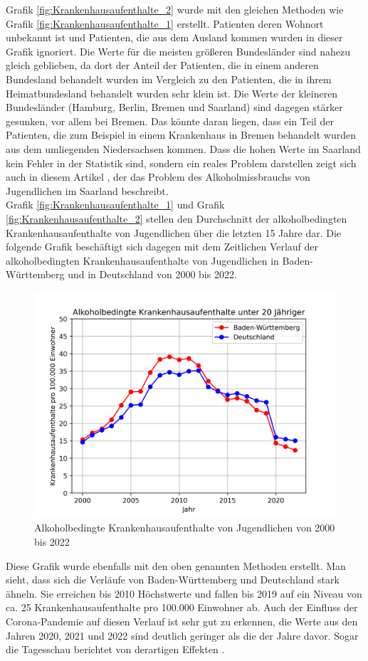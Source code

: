 \documentclass[12pt]{article}
\begin{document}
Grafik \ref{fig:Krankenhausaufenthalte_2} wurde mit den gleichen Methoden wie Grafik \ref{fig:Krankenhausaufenthalte_1} erstellt. Patienten deren Wohnort unbekannt ist und Patienten, die aus dem Ausland kommen wurden in dieser Grafik ignoriert. 
Die Werte für die meisten größeren Bundesländer sind nahezu gleich geblieben, da dort der Anteil der Patienten, die in einem anderen Bundesland behandelt wurden im Vergleich zu den Patienten, die in ihrem Heimatbundesland behandelt wurden sehr klein ist. Die Werte der kleineren Bundesländer (Hamburg, Berlin, Bremen und Saarland) sind dagegen stärker gesunken, vor allem bei Bremen. Das könnte daran liegen, dass ein Teil der Patienten, die zum Beispiel in einem Krankenhaus in Bremen behandelt wurden aus dem umliegenden Niedersachsen kommen. Dass die hohen Werte im Saarland kein Fehler in der Statistik sind, sondern ein reales Problem darstellen zeigt sich auch in diesem Artikel \autocite{noauthor_saarland_nodate}, der das Problem des Alkoholmissbrauchs von Jugendlichen im Saarland beschreibt. 
\\
Grafik \ref{fig:Krankenhausaufenthalte_1} und Grafik \ref{fig:Krankenhausaufenthalte_2} stellen den Durchschnitt der alkoholbedingten Krankenhausaufenthalte von Jugendlichen über die letzten 15 Jahre dar. Die folgende Grafik beschäftigt sich dagegen mit dem Zeitlichen Verlauf der alkoholbedingten Krankenhausaufenthalte von Jugendlichen in Baden-Württemberg und in Deutschland von 2000 bis 2022.
\begin{figure}[H]
    \centering
    \includegraphics[scale=.7]{"assets/Alkohol_BW_Ges.png"}
    \caption{Alkoholbedingte Krankenhausaufenthalte von Jugendlichen von 2000 bis 2022}
    \label{fig:Krankenhausaufenthalte_3}
\end{figure}
Diese Grafik wurde ebenfalls mit den oben genannten Methoden erstellt.
Man sieht, dass sich die Verläufe von Baden-Württemberg und Deutschland stark ähneln. Sie erreichen bis 2010 Höchstwerte und fallen bis 2019 auf ein Niveau von ca. 25 Krankenhausaufenthalte pro 100.000 Einwohner ab. Auch der Einfluss der Corona-Pandemie auf diesen Verlauf ist sehr gut zu erkennen, die Werte aus den Jahren 2020, 2021 und 2022 sind deutlich geringer als die der Jahre davor. Sogar die Tagesschau berichtet von derartigen Effekten \autocite{tagesschaude_weniger_nodate}.
\end{document}
